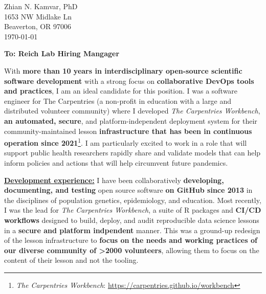 


\clearpage
\begin{flushright}
  Zhian N. Kamvar, PhD\\
  1653 NW Midlake Ln\\
  Beaverton, OR 97006\\
  \today
\end{flushright}

\textbf{To: Reich Lab Hiring Mangager}\\

\vspace{2ex}

With \textbf{more than 10 years in interdisciplinary open-source scientific software development} %
with a strong focus on \textbf{collaborative DevOps tools and practices}, %
I am an ideal candidate for this position. 
I was a software engineer for The Carpentries (a non-profit in education with a large and distributed volunteer community) where I developed \textit{The Carpentries Workbench}, \textbf{an automated, secure}, and platform-independent deployment system for their community-maintained lesson \textbf{infrastructure that has been in continuous operation since 2021}\footnote{\textit{The Carpentries Workbench}: \url{https://carpentries.github.io/workbench}}.%
I am particularly excited to work in a role that will support public health
researchers rapidly share and validate models that can help inform policies
and actions that will help circumvent future pandemics.



\vspace{2ex}

\underline{\textbf{Development experience:}}
I have been collaboratively \textbf{developing, documenting, and testing} open source software \textbf{on GitHub since 2013} in the disciplines of population genetics, epidemiology, and education.
Most recently, I was the lead for \textit{The Carpentries Workbench}, 
a suite of R packages and \textbf{CI/CD workflows} designed to build, deploy, and audit reproducible data science lessons in a \textbf{secure and platform indpendent} manner.
This was a ground-up redesign of the lesson infrastructure to \textbf{focus on
the needs and working practices of our diverse community of \textgreater2000 volunteers},
allowing them to focus on the content of their lesson and not the tooling.

